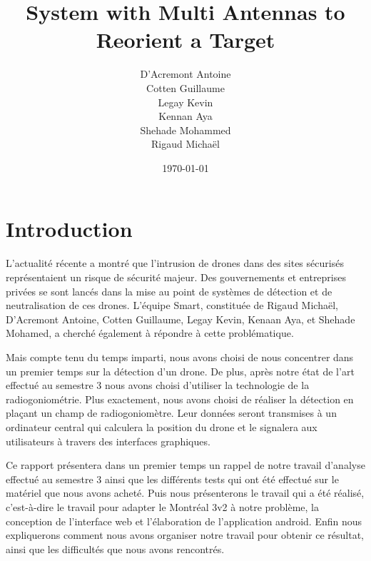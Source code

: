 \documentclass[a4paper, 11pt, oneside, oldfontcommands]{memoir}
\title{System with Multi Antennas to Reorient a Target}
\author{D'Acremont Antoine\\Cotten Guillaume\\Legay Kevin\\Kennan Aya\\Shehade Mohammed\\Rigaud Michaël}
\date{\today}
\newcounter{rem}[chapter]
\newcounter{th}[chapter]
\newcommand{\cad}{c'est-à-dire }
\begin{document}
\maketitle
\thispagestyle{empty}
\newpage

\tableofcontents





\chapter*{Introduction}

L’actualité récente a montré que l’intrusion de drones dans des sites sécurisés représentaient un risque de sécurité majeur. Des gouvernements et entreprises privées se sont lancés dans la mise au point de systèmes de détection et de neutralisation de ces drones. L'équipe Smart, constituée de Rigaud Michaël, D'Acremont Antoine, Cotten Guillaume, Legay Kevin, Kenaan Aya, et Shehade Mohamed, a cherché également à répondre à cette problématique.

Mais compte tenu du temps imparti, nous avons choisi de nous concentrer dans un premier temps sur la détection d'un drone. De plus, après notre état de l'art effectué au semestre 3 nous avons choisi d'utiliser la technologie de la radiogoniométrie.  Plus exactement, nous avons choisi de réaliser la détection en plaçant un champ de radiogoniomètre. Leur données seront transmises à un ordinateur central qui calculera la position du drone et le signalera aux utilisateurs à travers des interfaces graphiques.

Ce rapport présentera dans un premier temps un rappel de notre travail d'analyse effectué au semestre 3 ainsi que les différents tests qui ont été effectué sur le matériel que nous avons acheté. Puis nous présenterons le travail qui a été réalisé, \cad le travail pour adapter le Montréal 3v2 à notre problème, la conception de l'interface web et l'élaboration de l'application android. Enfin nous expliquerons comment nous avons organiser notre travail pour obtenir ce résultat, ainsi que les difficultés que nous avons rencontrés.



\newpage	  

\end{document}
